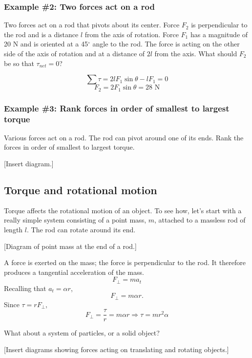 \subsubsection*{Example \#2: Two forces act on a rod}
Two forces act on a rod that pivots about its center. Force $F_2$ is perpendicular to the rod and is a distance $l$ from the axis of rotation. Force $F_1$ has a magnitude of 20 N and is oriented at a 45$^\circ$ angle to the rod. The force is acting on the other side of the axis of rotation and at a distance of $2l$ from the axis. What should $F_2$ be so that $\tau_{net}=0$?
\vspace{3cm}

$$\sum\tau=2lF_1\sin\theta-lF_1=0$$
$$F_2=2F_1\sin\theta=28\mbox{ N}$$

\subsubsection*{Example \#3: Rank forces in order of smallest to largest torque}
Various forces act on a rod. The rod can pivot around one of its ends. Rank the forces in order of smallest to largest torque.

[Insert diagram.]

\vspace{5cm}

\subsection{Torque and rotational motion}
Torque affects the rotational motion of an object. To see how, let's start with a really simple system consisting of a point mass, $m$, attached to a massless rod of length $l$. The rod can rotate around its end.

[Diagram of point mass at the end of a rod.]
\vspace{5cm}

A force is exerted on the mass; the force is perpendicular to the rod. It therefore produces a tangential acceleration of the mass.
$$F_\perp=ma_t$$
Recalling that $a_t=\alpha r$,
$$F_\perp=m\alpha r.$$
Since $\tau=rF_\perp$,
$$F_\perp=\frac{\tau}{r}=m\alpha r\Rightarrow \boxed{\tau=mr^2\alpha}$$

What about a system of particles, or a solid object?

[Insert diagrams showing forces acting on translating and rotating objects.]
\vspace{5cm}

